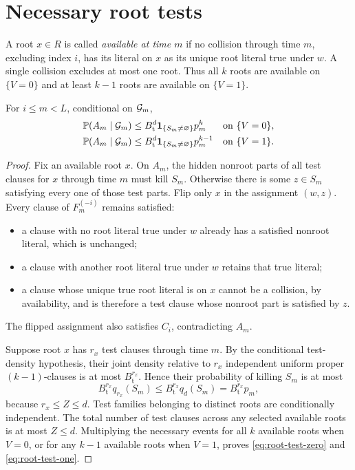 \section{Necessary root tests}
\label{sec:tests}

A root $x\in R$ is called \emph{available at time $m$} if no collision
through time $m$, excluding index $i$, has its literal on $x$ as its unique
root literal true under $w$.  A single collision excludes at most one root.
Thus all $k$ roots are available on $\{V=0\}$ and at least $k-1$ roots are
available on $\{V=1\}$.

\begin{lemma}
\label{lem:root-tests}
For $i\le m<L$, conditional on $\mathcal G_m$,
\begin{align}
    \mathbb P(A_m\mid\mathcal G_m)
    &\le
      B_{\mathrm{t}}^d\mathbf 1_{\{S_m\ne\varnothing\}}p_m^k
      &&\text{on }\{V=0\},
      \label{eq:root-test-zero}\\
    \mathbb P(A_m\mid\mathcal G_m)
    &\le
      B_{\mathrm{t}}^d\mathbf 1_{\{S_m\ne\varnothing\}}p_m^{k-1}
      &&\text{on }\{V=1\}.
      \label{eq:root-test-one}
\end{align}
\end{lemma}

\begin{proof}
Fix an available root $x$.  On $A_m$, the hidden nonroot parts of all test
clauses for $x$ through time $m$ must kill $S_m$.  Otherwise there is some
$z\in S_m$ satisfying every one of those test parts.  Flip only $x$ in the
assignment $(w,z)$.  Every clause of $F_m^{(-i)}$ remains satisfied:
\begin{itemize}
\item a clause with no root literal true under $w$ already has a satisfied
      nonroot literal, which is unchanged;
\item a clause with another root literal true under $w$ retains that true
      literal;
\item a clause whose unique true root literal is on $x$ cannot be a
      collision, by availability, and is therefore a test clause whose
      nonroot part is satisfied by $z$.
\end{itemize}
The flipped assignment also satisfies $C_i$, contradicting $A_m$.

Suppose root $x$ has $r_x$ test clauses through time $m$.  By the
conditional test-density hypothesis, their joint density relative to
$r_x$ independent uniform proper $(k-1)$-clauses is at most
$B_{\mathrm{t}}^{r_x}$.  Hence their probability of killing $S_m$ is at most
\[
    B_{\mathrm{t}}^{r_x}q_{r_x}(S_m)
    \le B_{\mathrm{t}}^{r_x}q_d(S_m)
    =B_{\mathrm{t}}^{r_x}p_m,
\]
because $r_x\le Z\le d$.  Test families belonging to distinct roots are
conditionally independent.  The total number of test clauses across any
selected available roots is at most $Z\le d$.  Multiplying the necessary
events for all $k$ available roots when $V=0$, or for any $k-1$ available
roots when $V=1$, proves \eqref{eq:root-test-zero} and
\eqref{eq:root-test-one}.
\end{proof}
